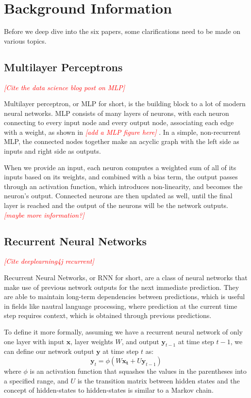 \documentclass[10pt,twocolumn,letterpaper]{article}
\newcommand{\todo}[1]{\textcolor{red}{{\em [#1]}} }
\newcommand{\matr}[1]{\mathbf{#1}}
\begin{document}
\section{Background Information}

Before we deep dive into the six papers, some clarifications need to be made
on various topics.

\subsection{Multilayer Perceptrons}
\todo{Cite the data science blog post on MLP}

Multilayer perceptron, or MLP for short, is the building block to a lot of
modern neural networks. MLP consists of many layers of neurons, with each
neuron connecting to every input node and every output node, associating each
edge with a weight, as shown in \todo{add a MLP figure here}. In a simple,
non-recurrent MLP, the connected nodes together make an acyclic graph with the
left side as inputs and right side as outputs. 

When we provide an input, each neuron computes a weighted sum of all of its
inputs based on its weights, and combined with a bias term, the output passes
through an activation function, which introduces non-linearity, and becomes
the neuron's output. Connected neurons are then updated as well, until the
final layer is reached and the output of the neurons will be the network
outputs. \todo{maybe more information?}

\subsection{Recurrent Neural Networks}
\todo{Cite deeplearning4j recurrent}

Recurrent Neural Networks, or RNN for short, are a class of neural networks
that make use of previous network outputs for the next immediate prediction.
They are able to maintain long-term dependencies between predictions, which is
useful in fields like nautral language processing, where prediction at the
current time step requires context, which is obtained through previous
predictions. 

To define it more formally, assuming we have a recurrent neural network of
only one layer with input $\matr{x}$, layer weights $W$, and output
$\boldsymbol{y}_{t-1}$ at time step $t-1$, we can define our network output
$\boldsymbol{y}$ at time step $t$ as:
%
\begin{equation}
  \boldsymbol{y}_t = \phi (W \matr{x_t} + U \boldsymbol{y}_{t-1})
\end{equation}
%
where $\phi$ is an activation function that squashes the values in the
parentheses into a specified range, and $U$ is the transition matrix between
hidden states and the concept of hidden-states to hidden-states is similar to
a Markov chain.
\end{document}
